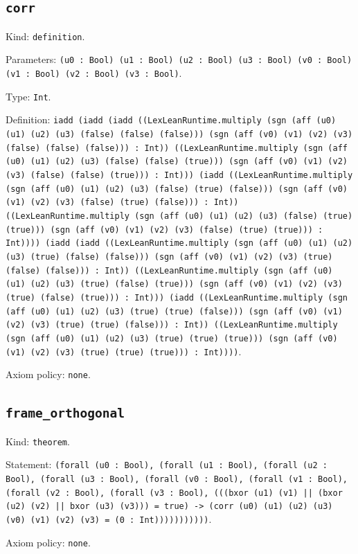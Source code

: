\documentclass[11pt]{article}
\begin{document}
\subsection*{\texttt{corr}}
\noindent Kind: \texttt{definition}.\par
\noindent Parameters: \texttt{(u0 : Bool) (u1 : Bool) (u2 : Bool) (u3 : Bool) (v0 : Bool) (v1 : Bool) (v2 : Bool) (v3 : Bool)}.\par
\noindent Type: \texttt{Int}.\par
\noindent Definition: \texttt{iadd (iadd (iadd ((LexLeanRuntime.multiply (sgn (aff (u0) (u1) (u2) (u3) (false) (false) (false))) (sgn (aff (v0) (v1) (v2) (v3) (false) (false) (false))) : Int)) ((LexLeanRuntime.multiply (sgn (aff (u0) (u1) (u2) (u3) (false) (false) (true))) (sgn (aff (v0) (v1) (v2) (v3) (false) (false) (true))) : Int))) (iadd ((LexLeanRuntime.multiply (sgn (aff (u0) (u1) (u2) (u3) (false) (true) (false))) (sgn (aff (v0) (v1) (v2) (v3) (false) (true) (false))) : Int)) ((LexLeanRuntime.multiply (sgn (aff (u0) (u1) (u2) (u3) (false) (true) (true))) (sgn (aff (v0) (v1) (v2) (v3) (false) (true) (true))) : Int)))) (iadd (iadd ((LexLeanRuntime.multiply (sgn (aff (u0) (u1) (u2) (u3) (true) (false) (false))) (sgn (aff (v0) (v1) (v2) (v3) (true) (false) (false))) : Int)) ((LexLeanRuntime.multiply (sgn (aff (u0) (u1) (u2) (u3) (true) (false) (true))) (sgn (aff (v0) (v1) (v2) (v3) (true) (false) (true))) : Int))) (iadd ((LexLeanRuntime.multiply (sgn (aff (u0) (u1) (u2) (u3) (true) (true) (false))) (sgn (aff (v0) (v1) (v2) (v3) (true) (true) (false))) : Int)) ((LexLeanRuntime.multiply (sgn (aff (u0) (u1) (u2) (u3) (true) (true) (true))) (sgn (aff (v0) (v1) (v2) (v3) (true) (true) (true))) : Int))))}.\par
\noindent Axiom policy: \texttt{none}.\par
\subsection*{\texttt{frame\_orthogonal}}
\noindent Kind: \texttt{theorem}.\par
\noindent Statement: \texttt{(forall (u0 : Bool), (forall (u1 : Bool), (forall (u2 : Bool), (forall (u3 : Bool), (forall (v0 : Bool), (forall (v1 : Bool), (forall (v2 : Bool), (forall (v3 : Bool), (((bxor (u1) (v1) || (bxor (u2) (v2) || bxor (u3) (v3))) = true) -> (corr (u0) (u1) (u2) (u3) (v0) (v1) (v2) (v3) = (0 : Int)))))))))))}.\par
\noindent Axiom policy: \texttt{none}.\par
\end{document}
